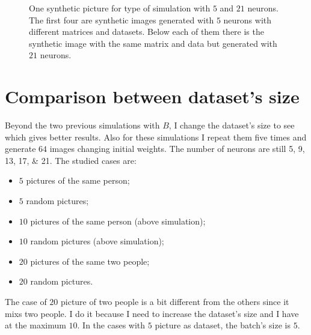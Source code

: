 \documentclass[a4paper,12pt]{article}
\begin{document}
\begin{figure}[!htbp]
  \caption[Picture of $B$ versus $L$ matrix]{One synthetic picture for type of simulation with $5$ and $21$ neurons.
  The first four are synthetic images generated with $5$ neurons with different matrices and datasets.
  Below each of them there is the synthetic image with the same matrix and data but generated with $21$ neurons.}
  \label{fig:greg_curti_p}
\end{figure}

\section{Comparison between dataset's size}
Beyond the two previous simulations with $B$, I change the dataset's size to see which gives better results.
Also for these simulations I repeat them five times and generate $64$ images changing initial weights.
The number of neurons are still \numlist{5;9;13;17;21}.
The studied cases are:
\begin{itemize}
  \item $5$ pictures of the same person;
  \item $5$ random pictures;
  \item $10$ pictures of the same person (above simulation);
  \item $10$ random pictures (above simulation);
  \item $20$ pictures of the same two people;
  \item $20$ random pictures.
\end{itemize}
The case of $20$ picture of two people is a bit different from the others since it mixs two people.
I do it because I need to increase the dataset's size and I have at the maximum $10$.
In the cases with $5$ picture as dataset, the batch's size is $5$.
\end{document}
